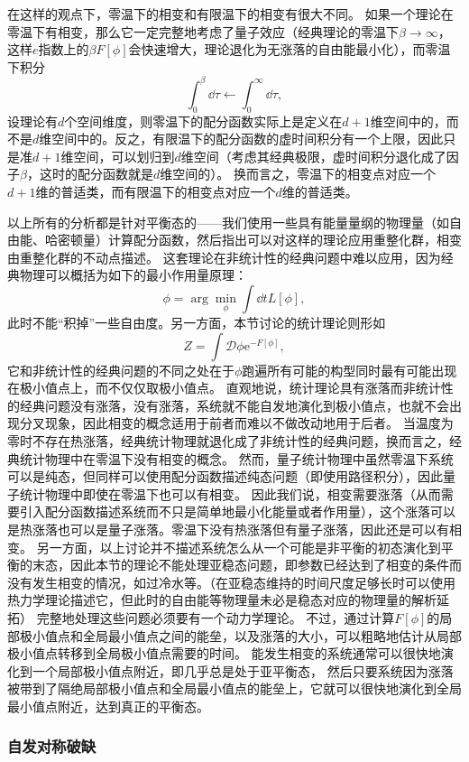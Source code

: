 \documentclass[hyperref, UTF8, a4paper]{ctexart}
\newcommand*{\ee}{\mathrm{e}}
\newcommand*{\fd}[1]{\mathcal{D}{#1}}
\begin{document}
在这样的观点下，零温下的相变和有限温下的相变有很大不同。
如果一个理论在零温下有相变，那么它一定完整地考虑了量子效应（经典理论的零温下$\beta \to \infty$，这样$e$指数上的$\beta F[\phi]$会快速增大，理论退化为无涨落的自由能最小化），而零温下积分
\[
    \int_0^\beta \dd{\tau} \longleftarrow \int_0^\infty \dd{\tau},
\]
设理论有$d$个空间维度，则零温下的配分函数实际上是定义在$d+1$维空间中的，而不是$d$维空间中的。反之，有限温下的配分函数的虚时间积分有一个上限，因此只是准$d+1$维空间，可以划归到$d$维空间（考虑其经典极限，虚时间积分退化成了因子$\beta$，这时的配分函数就是$d$维空间的）。
换而言之，零温下的相变点对应一个$d+1$维的普适类，而有限温下的相变点对应一个$d$维的普适类。

以上所有的分析都是针对平衡态的——我们使用一些具有能量量纲的物理量（如自由能、哈密顿量）计算配分函数，然后指出可以对这样的理论应用重整化群，相变由重整化群的不动点描述。
这套理论在非统计性的经典问题中难以应用，因为经典物理可以概括为如下的最小作用量原理：
\[
    \phi = \arg\min_{\phi} \int \dd{t} L[\phi],
\]
此时不能“积掉”一些自由度。另一方面，本节讨论的统计理论则形如
\[
   Z = \int \fd{\phi} \ee^{- F[\phi]},
\]
它和非统计性的经典问题的不同之处在于$\phi$跑遍所有可能的构型同时最有可能出现在极小值点上，而不仅仅取极小值点。
直观地说，统计理论具有涨落而非统计性的经典问题没有涨落，没有涨落，系统就不能自发地演化到极小值点，也就不会出现分叉现象，因此相变的概念适用于前者而难以不做改动地用于后者。
当温度为零时不存在热涨落，经典统计物理就退化成了非统计性的经典问题，换而言之，经典统计物理中在零温下没有相变的概念。
然而，量子统计物理中虽然零温下系统可以是纯态，但同样可以使用配分函数描述纯态问题（即使用路径积分），因此量子统计物理中即使在零温下也可以有相变。
因此我们说，相变需要涨落（从而需要引入配分函数描述系统而不只是简单地最小化能量或者作用量），这个涨落可以是热涨落也可以是量子涨落。零温下没有热涨落但有量子涨落，因此还是可以有相变。
另一方面，以上讨论并不描述系统怎么从一个可能是非平衡的初态演化到平衡的末态，因此本节的理论不能处理亚稳态问题，即参数已经达到了相变的条件而没有发生相变的情况，如过冷水等。（在亚稳态维持的时间尺度足够长时可以使用热力学理论描述它，但此时的自由能等物理量未必是稳态对应的物理量的解析延拓）
完整地处理这些问题必须要有一个动力学理论。
不过，通过计算$F[\phi]$的局部极小值点和全局最小值点之间的能垒，以及涨落的大小，可以粗略地估计从局部极小值点转移到全局极小值点需要的时间。
能发生相变的系统通常可以很快地演化到一个局部极小值点附近，即几乎总是处于亚平衡态，%
然后只要系统因为涨落被带到了隔绝局部极小值点和全局最小值点的能垒上，它就可以很快地演化到全局最小值点附近，达到真正的平衡态。

\subsubsection{自发对称破缺}
\end{document}
